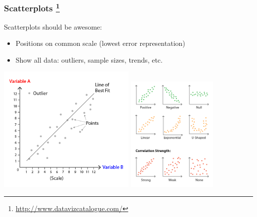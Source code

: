 
\begin{frame}
  \frametitle{Scatterplots
  \footnote{\tiny{\href{http://www.datavizcatalogue.com/}{http://www.datavizcatalogue.com/}}}
  }
  \begin{alertblock}{Scatterplots should be awesome:}
    \begin{itemize}
      \item Positions on common scale (lowest error representation)
      \item Show all data: outliers, sample sizes, trends, etc.
    \end{itemize}
  \end{alertblock}
  \begin{center}
    \includegraphics[width=0.5\textwidth,valign=t]{images/scatterplot1}
    \includegraphics[width=0.33\textwidth,valign=t]{images/scatterplot2}
  \end{center}
\end{frame}

